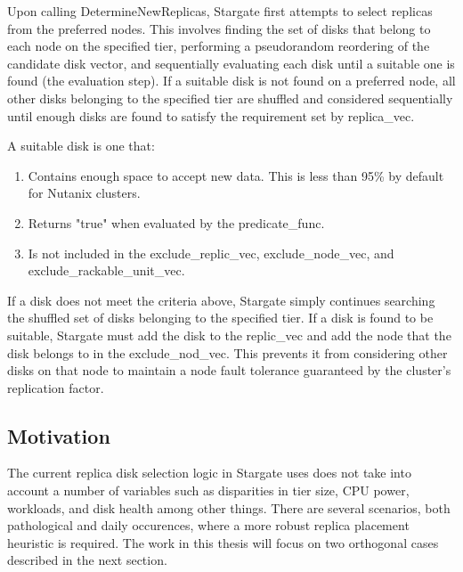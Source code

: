 \documentclass[12pt]{article}
\begin{document}
    Upon calling DetermineNewReplicas, Stargate first attempts to select
    replicas from the preferred nodes. This involves finding the set of disks
    that belong to each node on the specified tier, performing a pseudorandom
    reordering of the candidate disk vector, and sequentially evaluating each
    disk until a suitable one is found (the evaluation step). If a suitable
    disk is not found on a preferred node, all other disks belonging to the
    specified tier are shuffled and considered sequentially until enough disks
    are found to satisfy the requirement set by replica\_vec.

    A suitable disk is one that:


    \begin{tcolorbox}
    \begin{enumerate}
      \item Contains enough space to accept new data. This is less than 95\% by
            default for Nutanix clusters.  \item Returns "true" when evaluated by the
            predicate\_func.
      \item Is not included in the exclude\_replic\_vec, exclude\_node\_vec,
            and exclude\_rackable\_unit\_vec.
    \end{enumerate}
    \end{tcolorbox}
    \FloatBarrier

    If a disk does not meet the criteria above, Stargate simply continues searching
    the shuffled set of disks belonging to the specified tier. If a disk is
    found to be suitable, Stargate must add the disk to the replic\_vec and add
    the node that the disk belongs to in the exclude\_nod\_vec. This prevents
    it from considering other disks on that node to maintain a node fault
    tolerance guaranteed by the cluster's replication factor.

  \subsection{Motivation}

  The current replica disk selection logic in Stargate uses does not take into
  account a number of variables such as disparities in tier size, CPU power,
  workloads, and disk health among other things. There are several scenarios,
  both pathological and daily occurences, where a more robust replica placement
  heuristic is required. The work in this thesis will focus on two orthogonal
  cases described in the next section.
\end{document}
